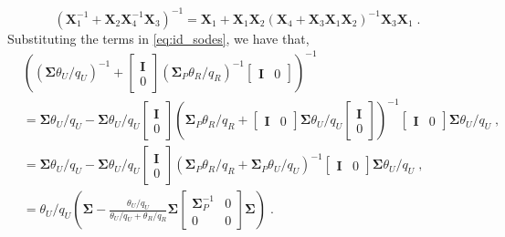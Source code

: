 \documentclass{article}
\begin{document}
\begin{equation}
	\left(\bm{X}^{-1}_1 + \bm{X}_2\bm{X}^{-1}_{4}\bm{X}_3\right)^{-1} = \bm{X}_1 + \bm{X}_1\bm{X}_2\left(\bm{X}_4 + \bm{X}_3\bm{X}_1\bm{X}_2\right)^{-1}\bm{X}_3\bm{X}_1\;.
	\label{eq:id_sodes}
\end{equation}
Substituting the terms in \eqref{eq:id_sodes}, we have that,
\begin{equation*}
	\begin{split}
		& \left(\left(\bm{\Sigma}\theta_U/q_U\right)^{-1}+\begin{bmatrix}
			\bm{I}\\
			0
		\end{bmatrix}
		\left(\bm{\Sigma}_P \theta_R/q_R\right)^{-1}\begin{bmatrix}
			\bm{I} & 0
		\end{bmatrix}\right)^{-1}\\ 
		&= \bm{\Sigma}\theta_U/q_U -\bm{\Sigma}\theta_U/q_U\begin{bmatrix}
			\bm{I}\\
			0
		\end{bmatrix}
		\left(\bm{\Sigma}_P \theta_R/q_R + \begin{bmatrix}
			\bm{I} & 0
		\end{bmatrix}
		\bm{\Sigma}\theta_U/q_U\begin{bmatrix}
			\bm{I}\\
			0
		\end{bmatrix}
		\right)^{-1}
		\begin{bmatrix}
			\bm{I} & 0
		\end{bmatrix}
		\bm{\Sigma}\theta_U/q_U\;,\\
		&= \bm{\Sigma}\theta_U/q_U - \bm{\Sigma}\theta_U/q_U\begin{bmatrix}
			\bm{I}\\
			0
		\end{bmatrix}
		\left(\bm{\Sigma}_P \theta_R/q_R + \bm{\Sigma}_P\theta_U/q_U\right)^{-1}\begin{bmatrix}
			\bm{I} & 0
		\end{bmatrix}
		\bm{\Sigma}\theta_U/q_U\;,\\
		&= \theta_U/q_U\left(\bm{\Sigma} - \frac{\theta_U/q_U}{\theta_U/q_U + \theta_R/q_R}\bm{\Sigma}\begin{bmatrix}
			\bm{\Sigma}^{-1}_{P} & 0\\
			0 & 0
		\end{bmatrix}
		\bm{\Sigma}
		\right)\;.
	\end{split}
\end{equation*}
\end{document}
